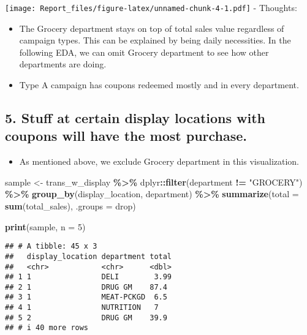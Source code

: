 \documentclass[
]{article}
\newenvironment{Shaded}{\begin{snugshade}}{\end{snugshade}}
\newcommand{\AttributeTok}[1]{\textcolor[rgb]{0.13,0.29,0.53}{#1}}
\newcommand{\DecValTok}[1]{\textcolor[rgb]{0.00,0.00,0.81}{#1}}
\newcommand{\FunctionTok}[1]{\textcolor[rgb]{0.13,0.29,0.53}{\textbf{#1}}}
\newcommand{\NormalTok}[1]{#1}
\newcommand{\OtherTok}[1]{\textcolor[rgb]{0.56,0.35,0.01}{#1}}
\newcommand{\SpecialCharTok}[1]{\textcolor[rgb]{0.81,0.36,0.00}{\textbf{#1}}}
\newcommand{\StringTok}[1]{\textcolor[rgb]{0.31,0.60,0.02}{#1}}
\providecommand{\tightlist}{%
  \setlength{\itemsep}{0pt}\setlength{\parskip}{0pt}}
\begin{document}
\texttt{[image: Report\_files/figure-latex/unnamed-chunk-4-1.pdf]} -
Thoughts:

\begin{itemize}
\tightlist
\item
  The Grocery department stays on top of total sales value regardless of
  campaign types. This can be explained by being daily necessities. In
  the following EDA, we can omit Grocery department to see how other
  departments are doing.
\item
  Type A campaign has coupons redeemed mostly and in every department.
\end{itemize}

\hypertarget{stuff-at-certain-display-locations-with-coupons-will-have-the-most-purchase.}{%
\subsection{5. Stuff at certain display locations with coupons will have
the most
purchase.}\label{stuff-at-certain-display-locations-with-coupons-will-have-the-most-purchase.}}

\begin{itemize}
\tightlist
\item
  As mentioned above, we exclude Grocery department in this
  visualization.
\end{itemize}

\begin{Shaded}
\begin{Highlighting}[]
\NormalTok{sample }\OtherTok{\textless{}{-}}\NormalTok{ trans\_w\_display }\SpecialCharTok{\%\textgreater{}\%}
\NormalTok{  dplyr}\SpecialCharTok{::}\FunctionTok{filter}\NormalTok{(department }\SpecialCharTok{!=} \StringTok{"GROCERY"}\NormalTok{) }\SpecialCharTok{\%\textgreater{}\%}
  \FunctionTok{group\_by}\NormalTok{(display\_location, department) }\SpecialCharTok{\%\textgreater{}\%}
  \FunctionTok{summarize}\NormalTok{(}\AttributeTok{total =} \FunctionTok{sum}\NormalTok{(total\_sales), }\AttributeTok{.groups =} \StringTok{\textquotesingle{}drop\textquotesingle{}}\NormalTok{)}

\FunctionTok{print}\NormalTok{(sample, }\AttributeTok{n =} \DecValTok{5}\NormalTok{)}
\end{Highlighting}
\end{Shaded}

\begin{verbatim}
## # A tibble: 45 x 3
##   display_location department total
##   <chr>            <chr>      <dbl>
## 1 1                DELI        3.99
## 2 1                DRUG GM    87.4 
## 3 1                MEAT-PCKGD  6.5 
## 4 1                NUTRITION   7   
## 5 2                DRUG GM    39.9 
## # i 40 more rows
\end{verbatim}
\end{document}
